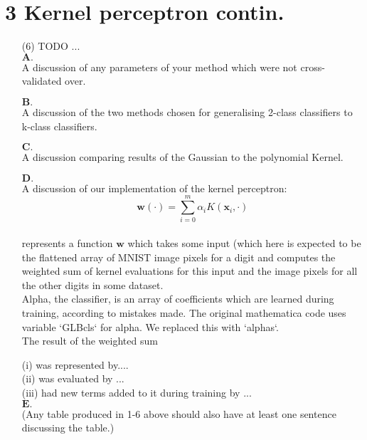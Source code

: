 \documentclass[a4paper,12pt]{article}
\begin{document}
\section*{3 Kernel perceptron contin.}
\begin{enumerate}
\item[(6)] TODO ...\\
$\textbf{A.}$\\
A discussion of any parameters of your method which were not cross-validated over.

$\textbf{B.}$\\
A discussion of the two methods chosen for generalising 2-class classifiers to k-class classifiers.

$\textbf{C.}$\\ 
A discussion comparing results of the Gaussian to the polynomial Kernel.

$\textbf{D.}$\\ 
A discussion of our implementation of the kernel perceptron:\\ 
$$\mathbf{w}(\cdot) = \sum_{i=0}^{m} \alpha_i K(\mathbf{x}_i, \cdot)$$ \\
represents a function $\textbf{w}$ which takes some input (which here is expected to be the flattened array of MNIST image pixels for a digit and computes the weighted sum of kernel evaluations for this input and the image pixels for all the other digits in some dataset.\\
Alpha, the classifier, is an array of coefficients which are learned during training, according to mistakes made. The original mathematica code uses variable `GLBcls` for alpha. We replaced this with `alphas`.\\
The result of the weighted sum 

(i) was represented by.... \\
(ii) was evaluated by ... \\
(iii) had new terms added to it during training by ... \\

$\textbf{E.}$\\ 
(Any table produced in 1-6 above should also have at least one sentence discussing the table.)

\end{enumerate}
\clearpage
\end{document}
